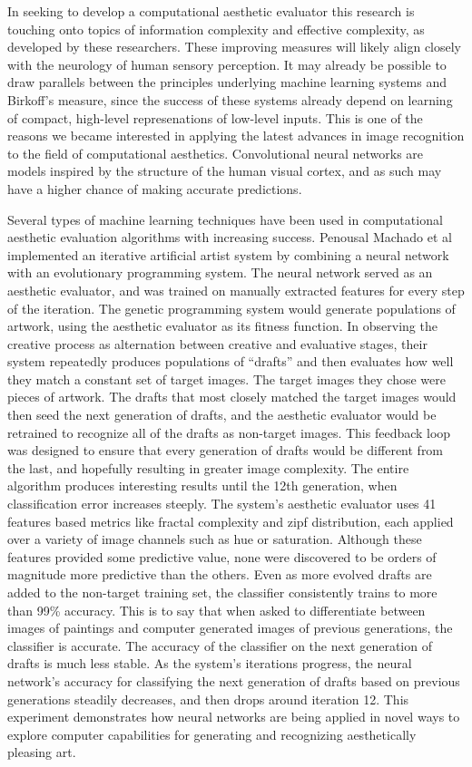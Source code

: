 \documentclass[midd]{thesis}
\begin{document}
In seeking to develop a computational aesthetic evaluator this research is touching onto topics of information complexity and effective complexity, as developed by these researchers. These improving measures will likely align closely with the neurology of human sensory perception. It may already be possible to draw parallels between the principles underlying machine learning systems and Birkoff's measure, since the success of these systems already depend on learning of compact, high-level represenations of low-level inputs. This is one of the reasons we became interested in applying the latest advances in image recognition to the field of computational aesthetics. Convolutional neural networks are models inspired by the structure of the human visual cortex, and as such may have a higher chance of making accurate predictions.

Several types of machine learning techniques have been used in computational aesthetic evaluation algorithms with increasing success. Penousal Machado et al \cite{machado2008experiments} implemented an iterative artificial artist system by combining a neural network with an evolutionary programming system. The neural network served as an aesthetic evaluator, and was trained on manually extracted features for every step of the iteration. The genetic programming system would generate populations of artwork, using the aesthetic evaluator as its fitness function. In observing the creative process as alternation between creative and evaluative stages, their system repeatedly produces populations of ``drafts'' and then evaluates how well they match a constant set of target images. The target images they chose were pieces of artwork. The drafts that most closely matched the target images would then seed the next generation of drafts, and the aesthetic evaluator would be retrained to recognize all of the drafts as non-target images. This feedback loop was designed to ensure that every generation of drafts would be different from the last, and hopefully resulting in greater image complexity. The entire algorithm produces interesting results until the 12th generation, when classification error increases steeply. The system's aesthetic evaluator uses 41 features based metrics like fractal complexity and zipf distribution, each applied over a variety of image channels such as hue or saturation. Although these features provided some predictive value, none were discovered to be orders of magnitude more predictive than the others. Even as more evolved drafts are added to the non-target training set, the classifier consistently trains to more than 99\% accuracy. This is to say that when asked to differentiate between images of paintings and computer generated images of previous generations, the classifier is accurate. The accuracy of the classifier on the next generation of drafts is much less stable. As the system's iterations progress, the neural network's accuracy for classifying the next generation of drafts based on previous generations steadily decreases, and then drops around iteration 12. This experiment demonstrates how neural networks are being applied in novel ways to explore computer capabilities for generating and recognizing aesthetically pleasing art. %
\end{document}
